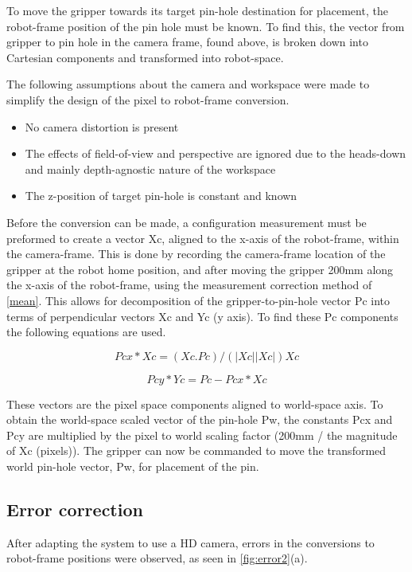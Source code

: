 \documentclass[11pt,a4paper, margin=1in]{report}
\begin{document}
To move the gripper towards its target pin-hole destination for placement, the robot-frame position of the pin hole must be known. To find this, the vector from gripper to pin hole in the camera frame,  found above, is broken down into Cartesian components and transformed into robot-space.

The following assumptions about the camera and workspace were made to simplify the design of the pixel to robot-frame conversion.
\begin{itemize}
	\item No camera distortion is present
	\item The effects of field-of-view and perspective are ignored due to the heads-down and mainly depth-agnostic nature of the workspace
	\item The z-position of target pin-hole is constant and known
\end{itemize}

Before the conversion can be made, a configuration measurement must be preformed to create a vector Xc, aligned to the x-axis of the robot-frame, within the camera-frame. This is done by recording the camera-frame location of the gripper at the robot home position, and after moving the gripper 200mm along the x-axis of the robot-frame, using the measurement correction method of \cref{mean}. This allows for decomposition of the gripper-to-pin-hole vector Pc into terms of perpendicular vectors Xc and Yc (y axis). To find these Pc components the following equations are used. 

\begin{equation}
Pcx*Xc = (Xc.Pc)/(|Xc||Xc|)Xc
\end{equation}

\begin{equation}
Pcy*Yc = Pc - Pcx*Xc
\end{equation}

These vectors are the pixel space components aligned to world-space axis. To obtain the world-space scaled vector of the pin-hole Pw, the constants Pcx and Pcy are multiplied by the pixel to world scaling factor (200mm / the magnitude of Xc (pixels)). The gripper can now be commanded to move the transformed world pin-hole vector, Pw, for placement of the pin.

\subsection{Error correction}

After adapting the system to use a HD camera, errors in the conversions to robot-frame positions were observed, as seen in \cref{fig:error2}(a).
\end{document}
